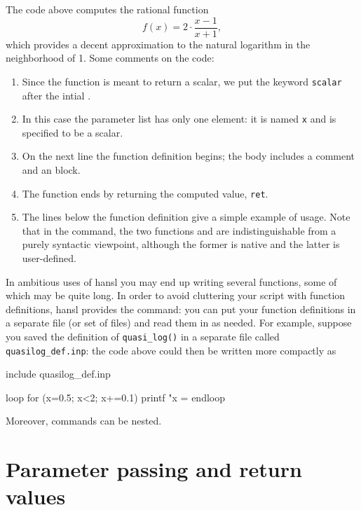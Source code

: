 The code above computes the rational function
\[
  f(x) = 2 \cdot \frac{x-1}{x+1} ,
\]
which provides a decent approximation to the natural logarithm in the
neighborhood of 1. Some comments on the code:

\begin{enumerate}
\item Since the function is meant to return a scalar, we put the
  keyword \texttt{scalar} after the intial .
\item In this case the parameter list has only one element: it is
  named \texttt{x} and is specified to be a scalar.
\item On the next line the function definition begins; the body
  includes a comment and an  block.
\item The function ends by returning the computed value, \texttt{ret}.
\item The lines below the function definition give a simple example of
  usage. Note that in the  command, the two functions
   and  are indistinguishable from a
  purely syntactic viewpoint, although the former is native and the
  latter is user-defined.
\end{enumerate}

In ambitious uses of hansl you may end up writing several functions,
some of which may be quite long. In order to avoid cluttering your
script with function definitions, hansl provides the 
command: you can put your function definitions in a separate file (or
set of files) and read them in as needed.  For example, suppose you
saved the definition of \verb|quasi_log()| in a separate file called
\verb|quasilog_def.inp|: the code above could then be written more
compactly as
\begin{code}
include quasilog_def.inp

loop for (x=0.5; x<2; x+=0.1)
   printf "x = %
endloop
\end{code}
Moreover,  commands can be nested.


\section{Parameter passing and return values}
\label{sec:params-returns}

